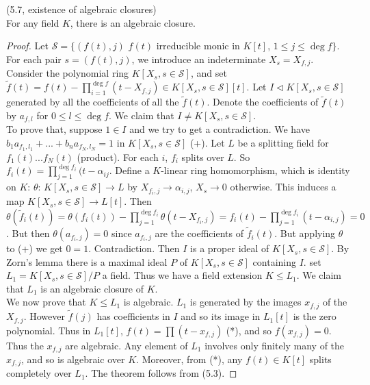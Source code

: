 \documentclass[a4paper]{article}
\begin{document}
\begin{thm} (5.7, existence of algebraic closures)\\
For any field $K$, there is an algebraic closure.
\begin{proof}
Let $\mathcal{S} = \{(f(t),j)$ $f(t)$ irreducible monic in $K[t]$, $1 \leq j \leq \deg f\}$. For each pair $s=(f(t),j)$, we introduce an indeterminate $X_s = X_{f,j}$. Consider the polynomial ring $K[X_s, s \in \mathcal{S}]$, and set $\tilde{f}(t) = f(t) - \prod_{i=1}^{\deg f} (t-X_{f,j}) \in K[X_s, s \in \mathcal{S}][t]$. Let $I \triangleleft K[X_s, s \in \mathcal{S}]$ generated by all the coefficients of all the $\tilde{f} (t)$. Denote the coefficients of $\tilde{f}(t)$ by $a_{f,l}$ for $0 \leq l \leq \deg{f}$. We claim that $I \neq K[X_s, s \in \mathcal{S}]$.\\
To prove that, suppose $1 \in I$ and we try to get a contradiction. We have $b_1 a_{f_1,l_1}+...+b_n a_{f_N,l_N} = 1$ in $K[X_s, s \in \mathcal{S}]$ (+). Let $L$ be a splitting field for $f_1(t)...f_N(t)$ (product). For each $i$, $f_i$ splits over $L$. So $f_i(t) = \prod_{j=1}^{\deg f_i} (t-\alpha_{ij}$. Define a $K$-linear ring homomorphism, which is identity on $K$: $\theta$: $K[X_s, s \in \mathcal{S}] \to L$ by $X_{f_i,j} \to \alpha_{i,j}$, $X_s \to 0$ otherwise. This induces a map $K[X_s,s \in \mathcal{S}] \to L[t]$. Then $\theta(\tilde{f}_i(t)) =\theta(f_i(t)) - \prod_{j=1}^{\deg f_i} \theta(t-X_{f_i,j}) = f_i(t) - \prod_{j=1}^{\deg f_i} (t-\alpha_{i,j}) = 0$. But then $\theta(a_{f_i,j}) = 0$ since $a_{f_i,j}$ are the coefficients of $\tilde{f}_i(t)$. But applying $\theta$ to (+) we get $0=1$. Contradiction.
Then $I$ is a proper ideal of $K[X_s,s \in \mathcal{S}]$. By Zorn's lemma there is a maximal ideal $P$ of $K[X_s,s \in \mathcal{S}]$ containing $I$. set $L_1 = K[X_s,s \in \mathcal{S}] / P$ a field. Thus we have a field extension $K \leq L_1$. We claim that $L_1$ is an algebraic closure of $K$.\\
We now prove that $K \leq L_1$ is algebraic. $L_1$ is generated by the images $x_{f,j}$ of the $X_{f,j}$. However $\tilde{f}(j)$ has coefficients in $I$ and so its image in $L_1[t]$ is the zero polynomial. Thus in $L_1[t]$, $f(t) = \prod (t-x_{f,j})$ (*), and so $f(x_{f,j}) = 0$. Thus the $x_{f,j}$ are algebraic. Any element of $L_1$ involves only finitely many of the $x_{f,j}$, and so is algebraic over $K$. Moreover, from (*), any $f(t) \in K[t]$ splits completely over $L_1$. The theorem follows from (5.3).
\end{proof}
\end{thm}
\end{document}
